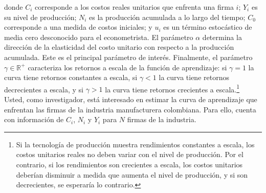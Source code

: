 \documentclass[a4paper]{article}
\begin{document}
donde $C_{i}$ corresponde a los costos reales unitarios que enfrenta una firma $i$; $Y_{i}$ es su nivel de producción;  $N_{i}$ es la producción acumulada a lo largo del tiempo; $C_{0}$ corresponde a una medida de costos iniciales; y $u_{i}$ es un término estocástico de media cero desconocido para el econometrista. El parámetro $\alpha$ determina la dirección de la elasticidad del costo unitario con respecto a la producción acumulada. Este es el principal parámetro de interés. Finalmente, el parámetro $\gamma \in \mathbb{R}^{+}$ caracteriza los retornos a escala de la función de aprendizaje: si $\gamma=1$ la curva tiene retornos constantes a escala, si $\gamma<1$ la curva tiene retornos decrecientes a escala, y si $\gamma>1$ la curva tiene retornos crecientes a escala.\footnote{Si la tecnología de producción muestra rendimientos constantes a escala, los costos unitarios reales no deben variar con el nivel de producción. Por el contrario, si los rendimientos son crecientes a escala, los costos unitarios deberían disminuir a medida que aumenta el nivel de producción, y si son decrecientes, se esperaría lo contrario.}\\

Usted, como investigador, está interesado en estimar la curva de aprendizaje que enfrentan las firmas de la industria manufacturera colombiana. Para ello, cuenta con información de $C_{i}$, $N_{i}$ y $Y_{i}$ para $N$ firmas de la industria.
\end{document}
